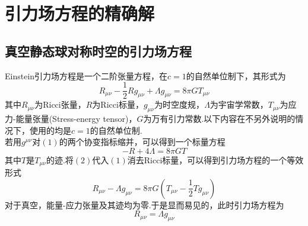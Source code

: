 \section{引力场方程的精确解}\label{sec:Exact Solutions}
	\subsection{真空静态球对称时空的引力场方程}
        Einstein引力场方程是一个二阶张量方程，在$c=1$的自然单位制下，其形式为
        \begin{equation}
            R_{\mu\nu}-\frac{1}{2}Rg_{\mu\nu}+\Lambda g_{\mu\nu}=8\pi GT_{\mu\nu}
        \end{equation}
        其中$R_{\mu\nu}$为Ricci张量，$R$为Ricci标量，$g_{\mu\nu}$为时空度规，$\Lambda$为宇宙学常数，$T_{\mu\nu}$为应力-能量张量(Stress-energy tensor)，$G$为万有引力常数.以下内容在不另外说明的情况下，使用的均是$c=1$的自然单位制.\\
        若用$g^{\mu\nu}$对$(1)$的两个协变指标缩并，可以得到一个标量方程
        \begin{equation}
            -R+4\Lambda=8\pi GT
        \end{equation}
        其中$T$是$T_{\mu\nu}$的迹.将$(2)$代入$(1)$消去Ricci标量，可以得到引力场方程的一个等效形式
        \begin{equation}
            R_{\mu\nu}-\Lambda g_{\mu\nu}=8\pi G(T_{\mu\nu}-\frac{1}{2}Tg_{\mu\nu})
        \end{equation}
        对于真空，能量-应力张量及其迹均为零.于是显而易见的，此时引力场方程为
        \begin{equation}
            R_{\mu\nu}=\Lambda g_{\mu\nu}
        \end{equation}
        
        
        
